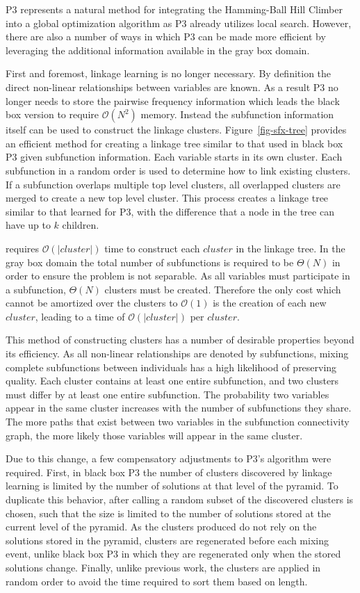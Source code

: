 \documentclass{sig-alternate}
\newcommand{\BigO}[1]{$\mathcal{O}{(#1)}$}
\begin{document}
P3 represents a natural method for integrating the Hamming-Ball Hill Climber into
a global optimization algorithm as P3 already utilizes local search. However, there
are also a number of ways in which P3 can be made more efficient by leveraging the
additional information available in the gray box domain.

First and foremost, linkage learning is no longer necessary. By definition
the direct non-linear relationships between variables are known. As a result
P3 no longer needs to store the pairwise frequency information which leads
the black box version to require \BigO{N^2} memory. Instead the subfunction
information itself can be used to construct the linkage clusters.
Figure~\ref{fig-sfx-tree} provides an efficient method for creating a linkage
tree similar to that used in black box P3 given subfunction information.
Each variable starts in its own cluster. Each subfunction in a random order
is used to determine how to link existing clusters. If a subfunction overlaps
multiple top level clusters, all overlapped clusters are merged to create a new
top level cluster. This process creates a linkage tree similar to that learned
for P3, with the difference that a node in the tree can have up to $k$ children.

 requires \BigO{|cluster|} time to construct each $cluster$
in the linkage tree. In the gray box domain the total number of subfunctions is required
to be $\Theta(N)$ in order to ensure the problem is not separable. As all variables must
participate in a subfunction, $\Theta(N)$ clusters must be created. Therefore
the only cost which cannot be amortized over the clusters to \BigO{1} is the creation
of each new $cluster$, leading to a time of \BigO{|cluster|} per $cluster$.

This method of constructing clusters has a number of desirable properties beyond its
efficiency. As all non-linear relationships are denoted by subfunctions, mixing
complete subfunctions between individuals has a high likelihood of preserving quality.
Each cluster contains at least one entire subfunction, and two
clusters must differ by at least one entire subfunction. The probability two
variables appear in the same cluster increases with the number of subfunctions
they share. The more paths that exist between two variables in the subfunction
connectivity graph, the more likely those variables will appear in the same cluster.

Due to this change, a few compensatory adjustments to P3's algorithm were required.
First, in black box P3 the number of clusters discovered by linkage learning is
limited by the number of solutions at that level of the pyramid. To duplicate this
behavior, after calling  a random subset of the discovered
clusters is chosen, such that the size is limited to the number of solutions
stored at the current level of the pyramid. As the clusters produced do not
rely on the solutions stored in the pyramid, clusters are regenerated before each
mixing event, unlike black box P3 in which they are regenerated only when the stored
solutions change. Finally, unlike previous work, the clusters are applied in random order
to avoid the time required to sort them based on length.
\end{document}
